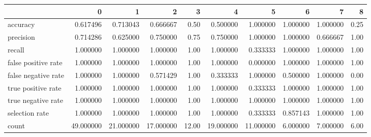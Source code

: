 \begin{tabular}{lrrrrrrrrr}
\toprule
{} &          0 &          1 &          2 &      3 &          4 &          5 &         6 &         7 &     8 \\
\midrule
accuracy            &   0.617496 &   0.713043 &   0.666667 &   0.50 &   0.500000 &   1.000000 &  1.000000 &  1.000000 &  0.25 \\
precision           &   0.714286 &   0.625000 &   0.750000 &   0.75 &   0.750000 &   1.000000 &  1.000000 &  0.666667 &  1.00 \\
recall              &   1.000000 &   1.000000 &   1.000000 &   1.00 &   1.000000 &   0.333333 &  1.000000 &  1.000000 &  1.00 \\
false positive rate &   1.000000 &   1.000000 &   1.000000 &   1.00 &   1.000000 &   0.000000 &  1.000000 &  1.000000 &  1.00 \\
false negative rate &   1.000000 &   1.000000 &   0.571429 &   1.00 &   0.333333 &   1.000000 &  0.500000 &  1.000000 &  0.00 \\
true positive rate  &   1.000000 &   1.000000 &   1.000000 &   1.00 &   1.000000 &   0.333333 &  1.000000 &  1.000000 &  1.00 \\
true negative rate  &   1.000000 &   1.000000 &   1.000000 &   1.00 &   1.000000 &   1.000000 &  1.000000 &  1.000000 &  1.00 \\
selection rate      &   1.000000 &   1.000000 &   1.000000 &   1.00 &   1.000000 &   0.333333 &  0.857143 &  1.000000 &  1.00 \\
count               &  49.000000 &  21.000000 &  17.000000 &  12.00 &  19.000000 &  11.000000 &  6.000000 &  7.000000 &  6.00 \\
\bottomrule
\end{tabular}
